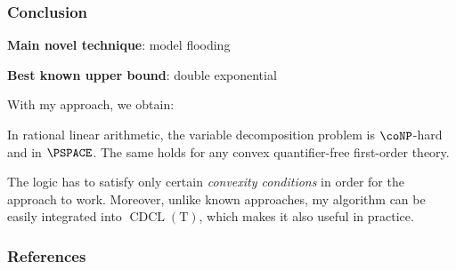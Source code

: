 \documentclass[handout]{beamer}
\DeclareMathOperator{\CDCL}{CDCL}
\def\CDCLT{\CDCL(\mathrm{T})}
\begin{document}
\begin{frame}
	\frametitle{Conclusion}
	
	\textbf{Main novel technique}: model flooding
	
	\vspace{10pt}
	
	\textbf{Best known upper bound}: double exponential
	
	\vspace{10pt}
	
	With my approach, we obtain:
	
	\begin{theorem}
		In rational linear arithmetic, the variable decomposition problem is $ \coNP $-hard and in $ \PSPACE $. The same holds for any convex quantifier-free first-order theory.
	\end{theorem}
	
	\vspace{5pt}
	
	The logic has to satisfy only certain \textit{convexity conditions} in order for the approach to work. Moreover, unlike known approaches, my algorithm can be easily integrated into $ \CDCLT $, which makes it also useful in practice.
	
\end{frame}

\begin{frame}[allowframebreaks]
\frametitle{References}


\end{frame}
\end{document}
